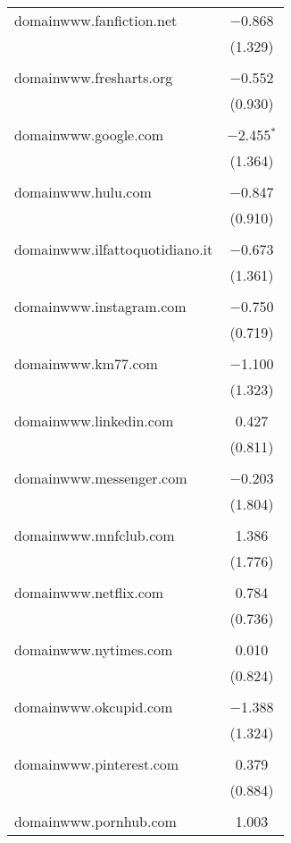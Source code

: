 \begin{table}[!htbp]
\begin{tabular}{@{\extracolsep{5pt}}lc}
 domainwww.fanfiction.net & $-$0.868 \\ 
  & (1.329) \\ 
  & \\ 
 domainwww.fresharts.org & $-$0.552 \\ 
  & (0.930) \\ 
  & \\ 
 domainwww.google.com & $-$2.455$^{*}$ \\ 
  & (1.364) \\ 
  & \\ 
 domainwww.hulu.com & $-$0.847 \\ 
  & (0.910) \\ 
  & \\ 
 domainwww.ilfattoquotidiano.it & $-$0.673 \\ 
  & (1.361) \\ 
  & \\ 
 domainwww.instagram.com & $-$0.750 \\ 
  & (0.719) \\ 
  & \\ 
 domainwww.km77.com & $-$1.100 \\ 
  & (1.323) \\ 
  & \\ 
 domainwww.linkedin.com & 0.427 \\ 
  & (0.811) \\ 
  & \\ 
 domainwww.messenger.com & $-$0.203 \\ 
  & (1.804) \\ 
  & \\ 
 domainwww.mnfclub.com & 1.386 \\ 
  & (1.776) \\ 
  & \\ 
 domainwww.netflix.com & 0.784 \\ 
  & (0.736) \\ 
  & \\ 
 domainwww.nytimes.com & 0.010 \\ 
  & (0.824) \\ 
  & \\ 
 domainwww.okcupid.com & $-$1.388 \\ 
  & (1.324) \\ 
  & \\ 
 domainwww.pinterest.com & 0.379 \\ 
  & (0.884) \\ 
  & \\ 
 domainwww.pornhub.com & 1.003 \\ 

\end{tabular}
\end{table}
